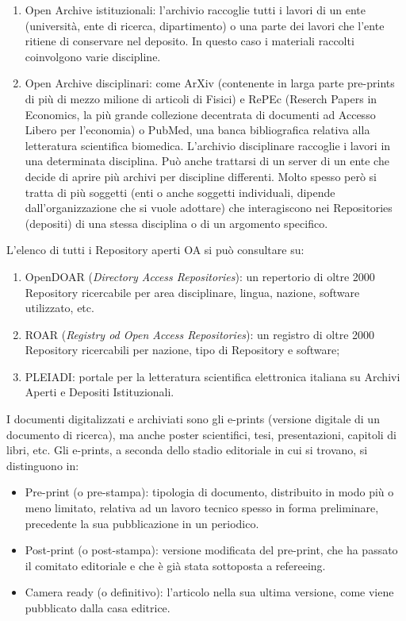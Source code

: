 \documentclass[
  b5paper,
  twoside,
  11pt,
  chapterprefix=false,
  bibliography=totocnumbered,
  listof=flat]{scrbook}
\begin{document}
\begin{enumerate}
\def\labelenumi{\arabic{enumi}.}
\item
  Open Archive istituzionali: l'archivio raccoglie tutti i lavori di
  un ente (università, ente di ricerca, dipartimento) o una parte dei
  lavori che l'ente ritiene di conservare nel deposito. In questo caso
  i materiali raccolti coinvolgono varie discipline.
\item
  Open Archive disciplinari: come ArXiv (contenente in larga parte
  pre-prints di più di mezzo milione di articoli di Fisici) e RePEc
  (Reserch Papers in Economics, la più grande collezione decentrata di
  documenti ad Accesso Libero per l'economia) o PubMed, una banca
  bibliografica relativa alla letteratura scientifica biomedica.
  L'archivio disciplinare raccoglie i lavori in una determinata
  disciplina. Può anche trattarsi di un server di un ente che decide
  di aprire più archivi per discipline differenti. Molto spesso però
  si tratta di più soggetti (enti o anche soggetti individuali,
  dipende dall'organizzazione che si vuole adottare) che interagiscono
  nei Repositories (depositi) di una stessa disciplina o di un
  argomento specifico.
\end{enumerate}

L'elenco di tutti i Repository aperti OA si può consultare su:

\begin{enumerate}
\def\labelenumi{\arabic{enumi}.}
\item
  OpenDOAR (\emph{Directory Access Repositories}): un repertorio di oltre
  2000 Repository ricercabile per area disciplinare, lingua, nazione,
  software utilizzato, etc.
\item
  ROAR (\emph{Registry od Open Access Repositories}): un registro di oltre
  2000 Repository ricercabili per nazione, tipo di Repository e
  software;
\item
  PLEIADI: portale per la letteratura scientifica elettronica italiana
  su Archivi Aperti e Depositi Istituzionali.
\end{enumerate}

I documenti digitalizzati e archiviati sono gli e-prints (versione
digitale di un documento di ricerca), ma anche poster scientifici, tesi,
presentazioni, capitoli di libri, etc. Gli e-prints, a seconda dello
stadio editoriale in cui si trovano, si distinguono in:

\begin{itemize}
\item
  Pre-print (o pre-stampa): tipologia di documento, distribuito in
  modo più o meno limitato, relativa ad un lavoro tecnico spesso in
  forma preliminare, precedente la sua pubblicazione in un periodico.
\item
  Post-print (o post-stampa): versione modificata del pre-print, che
  ha passato il comitato editoriale e che è già stata sottoposta a
  refereeing.
\item
  Camera ready (o definitivo): l'articolo nella sua ultima versione,
  come viene pubblicato dalla casa editrice.
\end{itemize}
\end{document}
